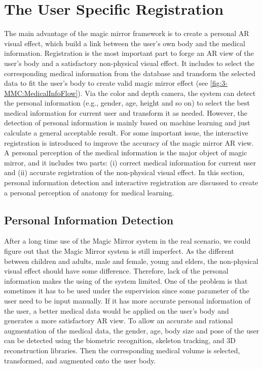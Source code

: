 \section{The User Specific Registration} \label{sec:3-PPMM:Registration}
The main advantage of the magic mirror framework is to create a personal AR visual effect, which build a link between the user's own body and the medical information. Registration is the most important part to forge an AR view of the user's body and a satisfactory non-physical visual effect.
It includes to select the corresponding medical information from the database and transform the selected data to fit the user's body to create valid magic mirror effect (see \figurename{\ref{fig:3-MMC:MedicalInfoFlow}}). Via the color and depth camera, the system can detect the personal information (e.g., gender, age, height and so on) to select the best medical information for current user and transform it as needed. However, the detection of personal information is mainly based on machine learning and just calculate a general acceptable result. For some important issue, the interactive registration is introduced to improve the accuracy of the magic mirror AR view.
A personal perception of the medical information is the major object of magic mirror, and it includes two parts: (i) correct medical information for current user and (ii) accurate registration of the non-physical visual effect. In this section, personal information detection and interactive registration are discussed to create a personal perception of anatomy for medical learning.

\subsection{Personal Information Detection}
After a long time use of the Magic Mirror system in the real scenario, we could figure out that the Magic Mirror system is still imperfect. As the different between children and adults, male and female, young and elders, the non-physical visual effect should have some difference. Therefore, lack of the personal information makes the using of the system limited. One of the problem is that sometimes it has to be used under the supervision since some parameter of the user need to be input manually. 
If it has more accurate personal information of the user, a better medical data would be applied on the user's body and generates a more satisfactory AR view.
To allow an accurate and rational augmentation of the medical data, the gender, age, body size and pose of the user can be detected using the biometric recognition, skeleton tracking, and 3D reconstruction libraries. Then the corresponding medical volume is selected, transformed, and augmented onto the user body. 

